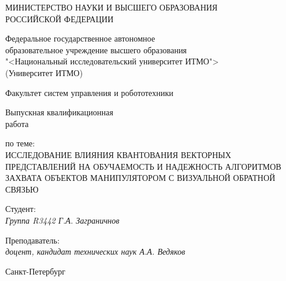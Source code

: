 \thispagestyle{empty}

\begin{center}
    МИНИСТЕРСТВО НАУКИ И ВЫСШЕГО ОБРАЗОВАНИЯ \\ РОССИЙСКОЙ ФЕДЕРАЦИИ

    \vspace{20pt}

    Федеральное государственное автономное \\ образовательное учреждение высшего образования \\
    "<Национальный исследовательский университет ИТМО"> \\
    (Университет ИТМО)

    \vspace{20pt}

    Факультет систем управления и робототехники
\end{center}

\vfill

\begin{center}
    Выпускная квалификационная \\
    работа

    \vspace{20pt}

    по теме: \\
    \uppercase{Исследование влияния квантования векторных представлений на обучаемость и надежность алгоритмов захвата объектов манипулятором с визуальной обратной связью}
\end{center}

\vfill
    \noindent Студент: \\
    \textit{Группа R3442 \hfill Г.А. Заграничнов}

    \vspace{20pt}

    \noindent Преподаватель: \\
    \textit{доцент, кандидат технических наук \hfill А.А. Ведяков}

\vfill

\begin{center}
    Санкт-Петербург \the\year
\end{center}